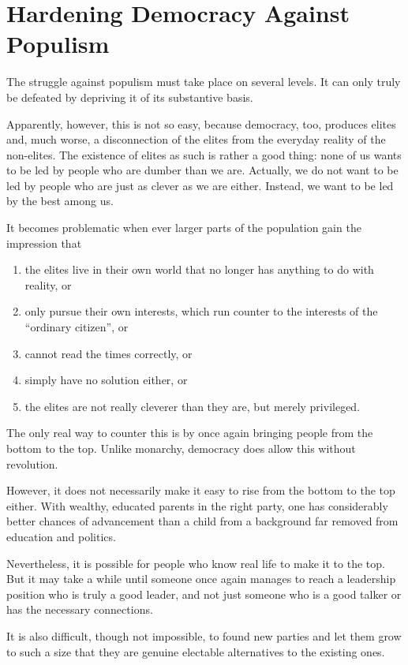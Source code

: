 \section{Hardening Democracy Against Populism} \label{sec:hardening_democracy}

The struggle against populism must take place on several levels.
It can only truly be defeated by depriving it of its substantive basis.

Apparently, however, this is not so easy, because democracy, too, produces elites and, much worse, a disconnection of the elites from the everyday reality of the non-elites.
The existence of elites as such is rather a good thing: none of us wants to be led by people who are dumber than we are.
Actually, we do not want to be led by people who are just as clever as we are either.
Instead, we want to be led by the best among us.

It becomes problematic when ever larger parts of the population gain the impression that
\begin{enumerate}[label=\alph*)]
    \item the elites live in their own world that no longer has anything to do with reality, or
    \item only pursue their own interests, which run counter to the interests of the \enquote{ordinary citizen}, or
    \item cannot read the times correctly, or
    \item simply have no solution either, or
    \item the elites are not really cleverer than they are, but merely privileged.
\end{enumerate}

The only real way to counter this is by once again bringing people from the bottom to the top.
Unlike monarchy, democracy does allow this without revolution.

However, it does not necessarily make it easy to rise from the bottom to the top either.
With wealthy, educated parents in the right party, one has considerably better chances of advancement than a child from a background far removed from education and politics.

Nevertheless, it is possible for people who know real life to make it to the top.
But it may take a while until someone once again manages to reach a leadership position who is truly a good leader, and not just someone who is a good talker or has the necessary connections.

It is also difficult, though not impossible, to found new parties and let them grow to such a size that they are genuine electable alternatives to the existing ones.

